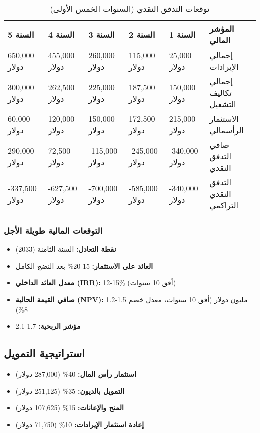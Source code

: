 \begin{table}[h]
\centering
\begin{tabular}{p{}p{}p{}p{}p{}p{}}
\hline
\textbf{السنة 5} & \textbf{السنة 4} & \textbf{السنة 3} & \textbf{السنة 2} & \textbf{السنة 1} & \textbf{المؤشر المالي} \\
\hline
650,000 دولار & 455,000 دولار & 260,000 دولار & 115,000 دولار & 25,000 دولار & إجمالي الإيرادات \\
300,000 دولار & 262,500 دولار & 225,000 دولار & 187,500 دولار & 150,000 دولار & إجمالي تكاليف التشغيل \\
60,000 دولار & 120,000 دولار & 150,000 دولار & 172,500 دولار & 215,000 دولار & الاستثمار الرأسمالي \\
\hline
290,000 دولار & 72,500 دولار & -115,000 دولار & -245,000 دولار & -340,000 دولار & صافي التدفق النقدي \\
-337,500 دولار & -627,500 دولار & -700,000 دولار & -585,000 دولار & -340,000 دولار & التدفق النقدي التراكمي \\
\hline
\end{tabular}
\caption{توقعات التدفق النقدي (السنوات الخمس الأولى)}
\end{table}

\subsubsection{التوقعات المالية طويلة الأجل}
\begin{itemize}
    \item \textbf{نقطة التعادل:} السنة الثامنة (2033)
    \item \textbf{العائد على الاستثمار:} 15-20\% بعد النضج الكامل
    \item \textbf{معدل العائد الداخلي (IRR):} 12-15\% (أفق 10 سنوات)
    \item \textbf{صافي القيمة الحالية (NPV):} 1.2-1.5 مليون دولار (أفق 10 سنوات، معدل خصم 8\%)
    \item \textbf{مؤشر الربحية:} 1.7-2.1
\end{itemize}

\subsection{استراتيجية التمويل}
\begin{itemize}
    \item \textbf{استثمار رأس المال:} 40\% (287,000 دولار)
    \item \textbf{التمويل بالديون:} 35\% (251,125 دولار)
    \item \textbf{المنح والإعانات:} 15\% (107,625 دولار)
    \item \textbf{إعادة استثمار الإيرادات:} 10\% (71,750 دولار)
\end{itemize}


